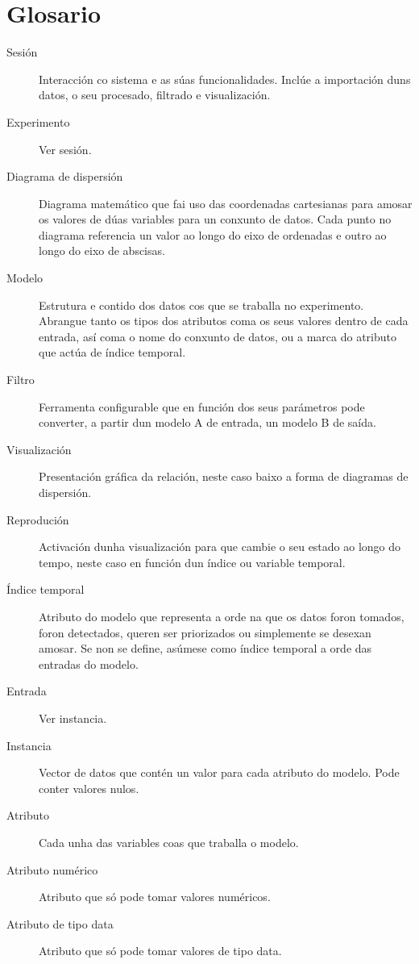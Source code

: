\pagestyle{plain}
\chapter*{Glosario}
\begin{description}
  \item[Sesión] \hfill
  Interacción co sistema e as súas funcionalidades. Inclúe a importación duns datos, o seu procesado, filtrado e visualización.
  \item[Experimento] \hfill
  Ver sesión.
	\item[Diagrama de dispersión] \hfill
  Diagrama matemático que fai uso das coordenadas cartesianas para amosar os valores de dúas variables para un conxunto de datos. Cada punto no diagrama referencia un valor ao longo do eixo de ordenadas e outro ao longo do eixo de abscisas.
	\item[Modelo] \hfill
  Estrutura e contido dos datos cos que se traballa no experimento. Abrangue tanto os tipos dos atributos coma os seus valores dentro de cada entrada, así coma o nome do conxunto de datos, ou a marca do atributo que actúa de índice temporal.
	\item[Filtro] \hfill
  Ferramenta configurable que en función dos seus parámetros pode converter, a partir dun modelo A de entrada, un modelo B de saída.
	\item[Visualización] \hfill
  Presentación gráfica da relación, neste caso baixo a forma de diagramas de dispersión.
	\item[Reprodución] \hfill
  Activación dunha visualización para que cambie o seu estado ao longo do tempo, neste caso en función dun índice ou variable temporal.
	\item[Índice temporal] \hfill
  Atributo do modelo que representa a orde na que os datos foron tomados, foron detectados, queren ser priorizados ou simplemente se desexan amosar. Se non se define, asúmese como índice temporal a orde das entradas do modelo.
	\item[Entrada] \hfill
  Ver instancia.
	\item[Instancia] \hfill
  Vector de datos que contén un valor para cada atributo do modelo. Pode conter valores nulos.
	\item[Atributo] \hfill
  Cada unha das variables coas que traballa o modelo.
	\item[Atributo numérico] \hfill
  Atributo que só pode tomar valores numéricos.
	\item[Atributo de tipo data] \hfill
  Atributo que só pode tomar valores de tipo data.

\end{description}
